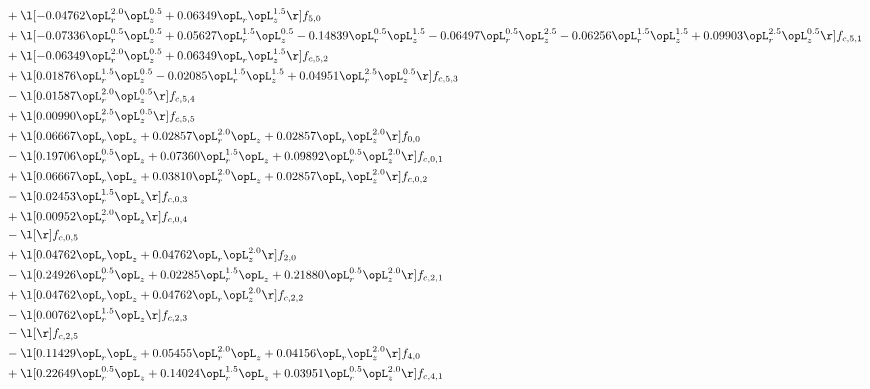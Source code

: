 \begin{alignat}{2}
& + \l[  -0.04762 \opL_r^{2.0} \opL_z^{0.5} +  0.06349 \opL_r \opL_z^{1.5}  \r] f_{5,0} \nonumber \\ 
& + \l[  -0.07336 \opL_r^{0.5} \opL_z^{0.5} +  0.05627 \opL_r^{1.5} \opL_z^{0.5}   -0.14839 \opL_r^{0.5} \opL_z^{1.5}   -0.06497 \opL_r^{0.5} \opL_z^{2.5}   -0.06256 \opL_r^{1.5} \opL_z^{1.5} +  0.09903 \opL_r^{2.5} \opL_z^{0.5}  \r] f_{c,5,1} \nonumber \\ 
& + \l[  -0.06349 \opL_r^{2.0} \opL_z^{0.5} +  0.06349 \opL_r \opL_z^{1.5}  \r] f_{c,5,2} \nonumber \\ 
& + \l[  0.01876 \opL_r^{1.5} \opL_z^{0.5}   -0.02085 \opL_r^{1.5} \opL_z^{1.5} +  0.04951 \opL_r^{2.5} \opL_z^{0.5}  \r] f_{c,5,3} \nonumber \\ 
& - \l[  0.01587 \opL_r^{2.0} \opL_z^{0.5}  \r] f_{c,5,4} \nonumber \\ 
& + \l[  0.00990 \opL_r^{2.5} \opL_z^{0.5}  \r] f_{c,5,5} \nonumber \\ 
& + \l[  0.06667 \opL_r \opL_z +  0.02857 \opL_r^{2.0} \opL_z +  0.02857 \opL_r \opL_z^{2.0}  \r] f_{0,0} \nonumber \\ 
& - \l[  0.19706 \opL_r^{0.5} \opL_z +  0.07360 \opL_r^{1.5} \opL_z +  0.09892 \opL_r^{0.5} \opL_z^{2.0}  \r] f_{c,0,1} \nonumber \\ 
& + \l[  0.06667 \opL_r \opL_z +  0.03810 \opL_r^{2.0} \opL_z +  0.02857 \opL_r \opL_z^{2.0}  \r] f_{c,0,2} \nonumber \\ 
& - \l[  0.02453 \opL_r^{1.5} \opL_z  \r] f_{c,0,3} \nonumber \\ 
& + \l[  0.00952 \opL_r^{2.0} \opL_z  \r] f_{c,0,4} \nonumber \\ 
& - \l[  \r] f_{c,0,5} \nonumber \\ 
& + \l[  0.04762 \opL_r \opL_z +  0.04762 \opL_r \opL_z^{2.0}  \r] f_{2,0} \nonumber \\ 
& - \l[  0.24926 \opL_r^{0.5} \opL_z +  0.02285 \opL_r^{1.5} \opL_z +  0.21880 \opL_r^{0.5} \opL_z^{2.0}  \r] f_{c,2,1} \nonumber \\ 
& + \l[  0.04762 \opL_r \opL_z +  0.04762 \opL_r \opL_z^{2.0}  \r] f_{c,2,2} \nonumber \\ 
& - \l[  0.00762 \opL_r^{1.5} \opL_z  \r] f_{c,2,3} \nonumber \\ 
& - \l[  \r] f_{c,2,5} \nonumber \\ 
& - \l[  0.11429 \opL_r \opL_z +  0.05455 \opL_r^{2.0} \opL_z +  0.04156 \opL_r \opL_z^{2.0}  \r] f_{4,0} \nonumber \\ 
& + \l[  0.22649 \opL_r^{0.5} \opL_z +  0.14024 \opL_r^{1.5} \opL_z +  0.03951 \opL_r^{0.5} \opL_z^{2.0}  \r] f_{c,4,1} \nonumber \\ 

\end{alignat}
